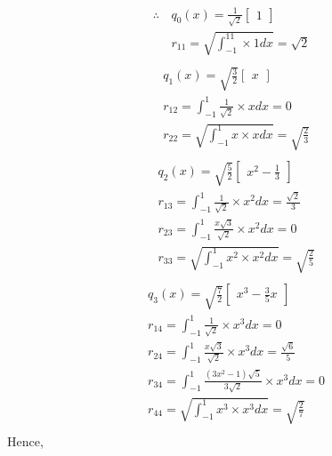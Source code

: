 \documentclass[12pt, letterpaper]{article}
\begin{document}
\begin{align*}
  \therefore\, &q_0(x) = \frac{1}{\sqrt{2}}\begin{bmatrix}1\end{bmatrix}\\
               &r_{11} = \sqrt{\int_{-1}^11\times 1dx} = \sqrt{2}\\
\end{align*}
\hline
\begin{align*}
               &q_1(x) = \sqrt{\frac{3}{2}}\begin{bmatrix}x\end{bmatrix}\\
               &r_{12} = \int_{-1}^1 \frac{1}{\sqrt{2}} \times xdx = 0\\
               &r_{22} = \sqrt{\int_{-1}^1x\times xdx} = \sqrt{\frac{2}{3}}\\
\end{align*}
\hline
\begin{align*}
               &q_2(x) = \sqrt{\frac{5}{2}}\begin{bmatrix}x^2 - \frac{1}{3}\end{bmatrix}\\
               &r_{13} = \int_{-1}^1 \frac{1}{\sqrt{2}} \times x^2dx = \frac{\sqrt{2}}{3} \\
               &r_{23} = \int_{-1}^1 \frac{x\sqrt{3}}{\sqrt{2}} \times x^2dx = 0\\
               &r_{33} = \sqrt{\int_{-1}^1x^2 \times x^2dx} = \sqrt{\frac{2}{5}}\\
\end{align*}
\hline
\begin{align*}
               &q_3(x) = \sqrt{\frac{7}{2}}\begin{bmatrix}x^3 - \frac{3}{5}x\end{bmatrix}\\
               &r_{14} = \int_{-1}^1 \frac{1}{\sqrt{2}} \times x^3dx = 0 \\
               &r_{24} = \int_{-1}^1 \frac{x\sqrt{3}}{\sqrt{2}} \times x^3dx = \frac{\sqrt{6}}{5} \\
               &r_{34} = \int_{-1}^1 \frac{(3x^2-1)\sqrt{5}}{3\sqrt{2}} \times x^3dx = 0\\
               &r_{44} = \sqrt{\int_{-1}^1x^3\times x^3dx} = \sqrt{\frac{2}{7}}\\
\end{align*}
\hline
\vspace{2mm}
Hence,
\end{document}

